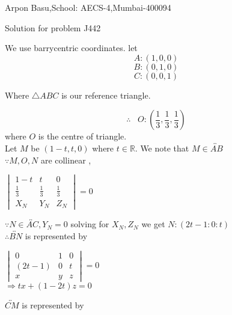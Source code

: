 \documentclass[a4paper,10pt]{article}
\begin{document}
\begin{center}


Arpon Basu,School: AECS-4,Mumbai-400094

Solution for problem J442
\end{center}

We use barrycentric coordinates.
let $$A:(1,0,0) $$
    $$B:(0,1,0) $$
    $$C:(0,0,1) $$

Where $\triangle ABC$ is our reference triangle.

$$ \therefore \hspace{10pt} O:(\frac{1}{3},\frac{1}{3},\frac{1}{3}) $$
where $O$ is the centre of triangle.\\
Let $M$ be $(1-t,t,0)$ where $t \in \mathbb{R}$. We note that $M \in \overleftrightarrow{AB}$ \\
$ \because M,O,N $ are collinear , 

\begin{center}
 \begin{math}
 \begin{vmatrix}
  1-t & t & 0\\
  \frac{1}{3} & \frac{1}{3} & \frac{1}{3}\\
  X_{N} & Y_{N} & Z_{N}
\end{vmatrix}=0
\end{math}
\end{center}



$ \because N \in \overleftrightarrow{AC} , Y_{N}=0 $  solving for $ X_{N} , Z_{N}$ we get $N:(2t-1:0:t)$ \\

$ \therefore \overleftrightarrow{BN}$ is represented by 

\begin{center}
\begin{math}
 \begin{vmatrix}
  0 & 1 & 0\\
  (2t-1) & 0 & t \\
 x & y & z
\end{vmatrix}=0 
\end{math}
\vspace{5pt} \\
\begin{math}
\Rightarrow tx+(1-2t)z=0
\end{math}
\end{center}



$ \overleftrightarrow{CM}$ is represented by 
\end{document}
